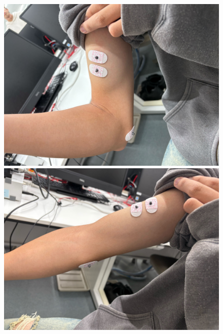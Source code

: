 \documentclass[dvipdfmx, titlepage, t]{jsarticle}
\begin{document}
\begin{figure}[H]
    \begin{minipage}[b]{0.32\linewidth}
        \centering
        \includegraphics[width=\linewidth]{figure/IMG_6939.jpg} %
    \end{minipage}
    \hfil
    \begin{minipage}[b]{0.32\linewidth}
        \centering
        \includegraphics[width=\linewidth]{figure/IMG_6941.jpg} %
    \end{minipage}
    \hfil
    \begin{minipage}[b]{0.32\linewidth}
        \centering

\end{minipage}
\end{figure}
\end{document}
